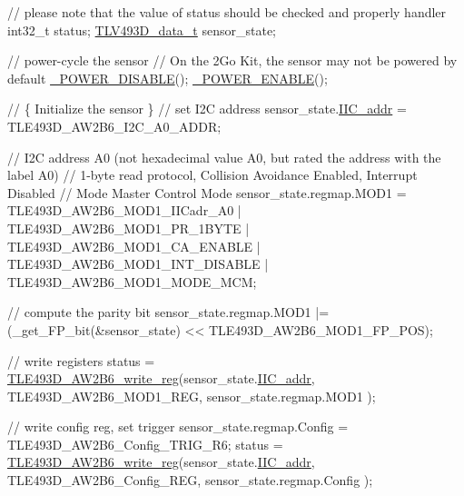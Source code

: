 \begin{DoxyCode}
\textcolor{comment}{// please note that the value of status should be checked and properly handler}
int32\_t status;
\mbox{\hyperlink{struct_t_l_v493_d__data__t}{TLV493D\_data\_t}} sensor\_state;


\textcolor{comment}{// power-cycle the sensor}
\textcolor{comment}{// On the 2Go Kit, the sensor may not be powered by default}
\mbox{\hyperlink{interface_8h_abadb0076439c5df777bd4e545d82dcce}{\_POWER\_DISABLE}}();
\mbox{\hyperlink{interface_8h_a049c9e0574db2668751f73dcacaacfe7}{\_POWER\_ENABLE}}();

\textcolor{comment}{// \{ Initialize the sensor \}}
\textcolor{comment}{// set I2C address}
sensor\_state.\mbox{\hyperlink{struct_t_l_v493_d__data__t_a047c4ab12450e0186489f3bfadc8cbc4}{IIC\_addr}} = TLE493D\_AW2B6\_I2C\_A0\_ADDR;

\textcolor{comment}{// I2C address A0 (not hexadecimal value A0, but rated the address with the label A0)}
\textcolor{comment}{// 1-byte read protocol, Collision Avoidance Enabled, Interrupt Disabled}
\textcolor{comment}{// Mode Master Control Mode}
sensor\_state.regmap.MOD1 = TLE493D\_AW2B6\_MOD1\_IICadr\_A0
                           | TLE493D\_AW2B6\_MOD1\_PR\_1BYTE
                           | TLE493D\_AW2B6\_MOD1\_CA\_ENABLE
                           | TLE493D\_AW2B6\_MOD1\_INT\_DISABLE
                           | TLE493D\_AW2B6\_MOD1\_MODE\_MCM;

\textcolor{comment}{// compute the parity bit}
sensor\_state.regmap.MOD1 |= (\_get\_FP\_bit(&sensor\_state) << TLE493D\_AW2B6\_MOD1\_FP\_POS);

\textcolor{comment}{// write registers}
status = \mbox{\hyperlink{_t_l_e___a_w2_b6__driver_8c_a8471b6d4fdaac89ba4f91bd23207acca}{TLE493D\_AW2B6\_write\_reg}}(sensor\_state.\mbox{\hyperlink{struct_t_l_v493_d__data__t_a047c4ab12450e0186489f3bfadc8cbc4}{IIC\_addr}},
                                TLE493D\_AW2B6\_MOD1\_REG,
                                sensor\_state.regmap.MOD1
);

\textcolor{comment}{// write config reg, set trigger}
sensor\_state.regmap.Config = TLE493D\_AW2B6\_Config\_TRIG\_R6;
status = \mbox{\hyperlink{_t_l_e___a_w2_b6__driver_8c_a8471b6d4fdaac89ba4f91bd23207acca}{TLE493D\_AW2B6\_write\_reg}}(sensor\_state.\mbox{\hyperlink{struct_t_l_v493_d__data__t_a047c4ab12450e0186489f3bfadc8cbc4}{IIC\_addr}},
                               TLE493D\_AW2B6\_Config\_REG,
                               sensor\_state.regmap.Config
);


\end{DoxyCode}
